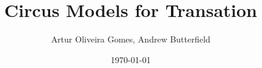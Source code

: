 \documentclass[10pt]{article}
\author{Artur Oliveira Gomes, Andrew Butterfield}
\title{Circus Models for Transation}
\date\today
\begin{document}
\maketitle
\tableofcontents
\pagebreak








\end{document}
